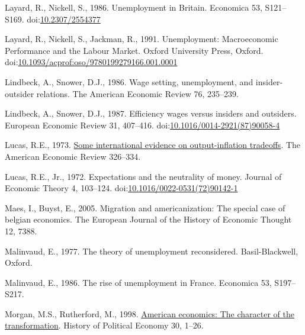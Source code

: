 \documentclass[
  12pt,
  onecolumn]{article}
\newlength{\cslhangindent}
\newlength{\cslentryspacingunit} %
\newenvironment{CSLReferences}[2] %
 {%
  \setlength{\parindent}{0pt}
  \ifodd #1
  \let\oldpar\par
  \def\par{\hangindent=\cslhangindent\oldpar}
  \fi
  \setlength{\parskip}{#2\cslentryspacingunit}
 }%
 {}
\begin{document}
\begin{CSLReferences}{1}{0}
\leavevmode{}%
Layard, R., Nickell, S., 1986. Unemployment in {Britain}. Economica 53,
S121--S169. doi:\href{https://doi.org/10.2307/2554377}{10.2307/2554377}

\leavevmode{}%
Layard, R., Nickell, S., Jackman, R., 1991. Unemployment: {Macroeconomic
Performance} and the {Labour Market}. {Oxford University Press},
{Oxford}.
doi:\href{https://doi.org/10.1093/acprof:oso/9780199279166.001.0001}{10.1093/acprof:oso/9780199279166.001.0001}

\leavevmode{}%
Lindbeck, A., Snower, D.J., 1986. Wage setting, unemployment, and
insider-outsider relations. The American Economic Review 76, 235--239.

\leavevmode{}%
Lindbeck, A., Snower, D.J., 1987. Efficiency wages versus insiders and
outsiders. European Economic Review 31, 407--416.
doi:\href{https://doi.org/10.1016/0014-2921(87)90058-4}{10.1016/0014-2921(87)90058-4}

\leavevmode{}%
Lucas, R.E., 1973. \href{http://www.jstor.org/stable/1914364}{Some
international evidence on output-inflation tradeoffs}. The American
Economic Review 326--334.

\leavevmode{}%
Lucas, R.E., Jr., 1972. Expectations and the neutrality of money.
Journal of Economic Theory 4, 103--124.
doi:\href{https://doi.org/10.1016/0022-0531(72)90142-1}{10.1016/0022-0531(72)90142-1}

\leavevmode{}%
Maes, I., Buyst, E., 2005. Migration and americanization: The special
case of belgian economics. The European Journal of the History of
Economic Thought 12, 7388.

\leavevmode{}%
Malinvaud, E., 1977. The theory of unemployment reconsidered.
{Basil-Blackwell}, {Oxford}.

\leavevmode{}%
Malinvaud, E., 1986. The rise of unemployment in {France}. Economica 53,
S197--S217.

\leavevmode{}%
Morgan, M.S., Rutherford, M., 1998.
\href{http://search.ebscohost.com/login.aspx?direct=true\&db=bth\&AN=7752144\&lang=fr\&site=ehost-live}{American
economics: The character of the transformation}. History of Political
Economy 30, 1--26.


\end{CSLReferences}
\end{document}
